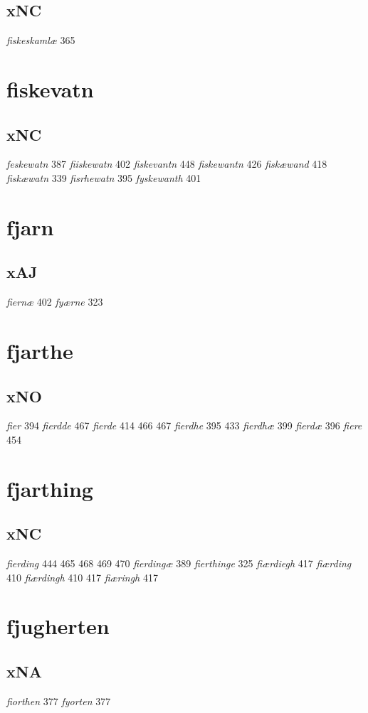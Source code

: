 \documentclass[a4paper,twocolumn]{article}
\begin{document}
\subsection{xNC}
\label{sec:org640c68a}
\emph{fiskeskamlæ} 365 
\section{fiskevatn}
\label{sec:orgc292e32}
\subsection{xNC}
\label{sec:org21ea22f}
\emph{feskewatn} 387 \emph{fiiskewatn} 402 \emph{fiskevantn} 448 \emph{fiskewantn} 426 \emph{fiskæwand} 418 \emph{fiskæwatn} 339 \emph{fisrhewatn} 395 \emph{fyskewanth} 401 
\section{fjarn}
\label{sec:org74e42d5}
\subsection{xAJ}
\label{sec:org76dbe4a}
\emph{fiernæ} 402 \emph{fyærne} 323 
\section{fjarthe}
\label{sec:org4b86bad}
\subsection{xNO}
\label{sec:org690e302}
\emph{fier} 394 \emph{fierdde} 467 \emph{fierde} 414 466 467 \emph{fierdhe} 395 433 \emph{fierdhæ} 399 \emph{fierdæ} 396 \emph{fiere} 454 
\section{fjarthing}
\label{sec:org60edd07}
\subsection{xNC}
\label{sec:org7105627}
\emph{fierding} 444 465 468 469 470 \emph{fierdingæ} 389 \emph{fierthinge} 325 \emph{fiærdiegh} 417 \emph{fiærding} 410 \emph{fiærdingh} 410 417 \emph{fiæringh} 417 
\section{fjugherten}
\label{sec:org630f621}
\subsection{xNA}
\label{sec:orgbee83bc}
\emph{fiorthen} 377 \emph{fyorten} 377 
\end{document}
